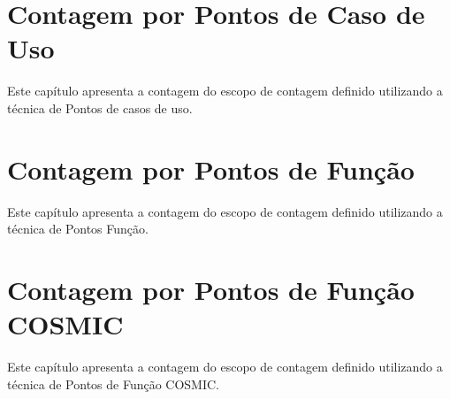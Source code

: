 \chapter{Contagem por Pontos de Caso de Uso}
  
  Este capítulo apresenta a contagem do escopo de contagem definido utilizando a técnica de Pontos de casos de uso.
  
  

\chapter{Contagem por Pontos de Função}

  Este capítulo apresenta a contagem do escopo de contagem definido utilizando a técnica de Pontos Função.
  
  

\chapter{Contagem por Pontos de Função COSMIC}
  
  Este capítulo apresenta a contagem do escopo de contagem definido utilizando a técnica de Pontos de Função COSMIC.
  
  